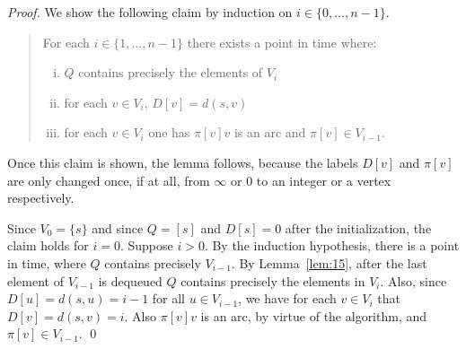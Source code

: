 \begin{proof}  
  We show the following claim by induction on $i \in \{0,\ldots,n-1\}$. 
  \begin{quote}
    For each $i \in \{1,\ldots,n-1\}$ there exists a point in time where:
    \begin{enumerate}[i)]
    \item     $Q$ contains precisely  the elements  of $V_i$
      \label{item:f1}
    \item for each $v \in V_i$,  $D[v] = d(s,v)$ \label{item:f2}
    \item for each $v \in V_i$  one has   $\pi[v]v$
      is an arc and $\pi[v] \in V_{i-1}$. 
    \end{enumerate}
  \end{quote}
Once this claim is shown, the lemma follows, because the labels $D[v]$
and $\pi[v]$ are only changed once, if at all, from $\infty$ or $0$ 
to an integer
or a vertex respectively. 

Since $V_0 = \{s\}$ and since  $Q = [s]$ and $D[s] = 0$ after the initialization, the
claim holds for $ i = 0$. Suppose $i>0$. By the induction hypothesis,
there is a point in time, where  $Q$ contains precisely $V_{i-1}$. By
Lemma~\ref{lem:15}, after the last element of $V_{i-1}$ is dequeued
$Q$ contains precisely the elements in $V_i$. Also, since $D[u] =
d(s,u) = i-1$ for all $u \in V_{i-1}$, we have for each $v \in V_i$ that  $D[v]
= d(s,v)=i$. Also $\pi[v]v$ is an arc, by virtue of the algorithm, and
$\pi[v] \in V_{i-1}$.  \qed 
\end{proof}


  


